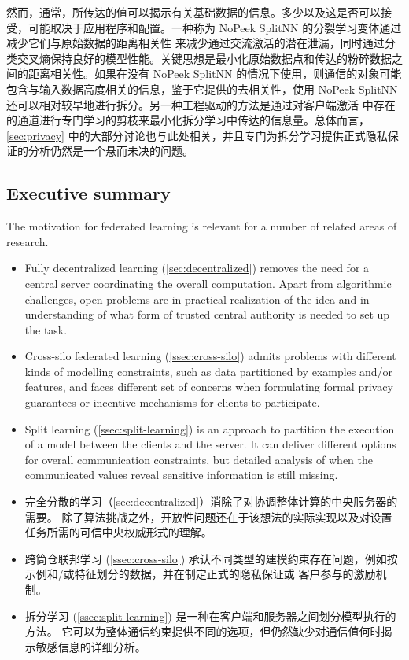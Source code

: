 然而，通常，所传达的值可以揭示有关基础数据的信息。多少以及这是否可以接受，可能取决于应用程序和配置。一种称为 NoPeek SplitNN \citep{vepakomma2019reducing} 的分裂学习变体通过减少它们与原始数据的距离相关性 \citep{vepakomma2018supervised,szekely2007measuring} 来减少通过交流激活的潜在泄漏，同时通过分类交叉熵保持良好的模型性能。关键思想是最小化原始数据点和传达的粉碎数据之间的距离相关性。如果在没有 NoPeek SplitNN 的情况下使用，则通信的对象可能包含与输入数据高度相关的信息，鉴于它提供的去相关性，使用 NoPeek SplitNN 还可以相对较早地进行拆分。另一种工程驱动的方法是通过对客户端激活\citep{channelPruning} 中存在的通道进行专门学习的剪枝来最小化拆分学习中传达的信息量。总体而言，\cref{sec:privacy} 中的大部分讨论也与此处相关，并且专门为拆分学习提供正式隐私保证的分析仍然是一个悬而未决的问题。

\subsection{Executive summary}
The motivation for federated learning is relevant for a number of related areas of research.

\begin{itemize}
\item Fully decentralized learning (\cref{sec:decentralized}) removes the need for a central server coordinating the overall computation. Apart from algorithmic challenges, open problems are in practical realization of the idea and in understanding of what form of trusted central authority is needed to set up the task.
\item Cross-silo federated learning (\cref{ssec:cross-silo}) admits problems with different kinds of modelling constraints, such as data partitioned by examples and/or features, and faces different set of concerns when formulating formal privacy guarantees or incentive mechanisms for clients to participate.
\item Split learning (\cref{ssec:split-learning}) is an approach to partition the execution of a model between the clients and the server. It can deliver different options for overall communication constraints, but detailed analysis of when the communicated values reveal sensitive information is still missing.
\end{itemize}


\begin{itemize}
  \item 完全分散的学习（\cref{sec:decentralized}）消除了对协调整体计算的中央服务器的需要。 除了算法挑战之外，开放性问题还在于该想法的实际实现以及对设置任务所需的可信中央权威形式的理解。
  \item 跨筒仓联邦学习 (\cref{ssec:cross-silo}) 承认不同类型的建模约束存在问题，例如按示例和/或特征划分的数据，并在制定正式的隐私保证或 客户参与的激励机制。
  \item 拆分学习 (\cref{ssec:split-learning}) 是一种在客户端和服务器之间划分模型执行的方法。 它可以为整体通信约束提供不同的选项，但仍然缺少对通信值何时揭示敏感信息的详细分析。
  \end{itemize}


\pagebreak